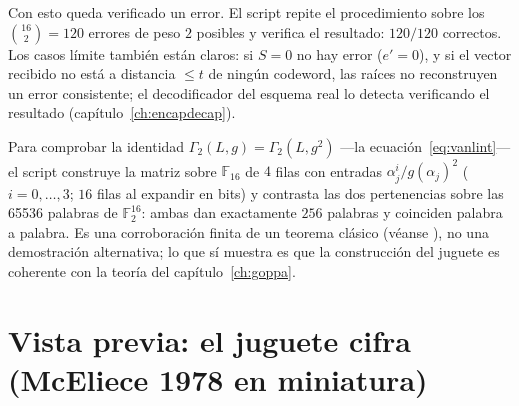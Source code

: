 \documentclass[11pt,a4paper,oneside]{report}
\newcommand{\F}{\mathbb{F}}
\newcommand{\GF}[1]{\mathbb{F}_{#1}}
\newcommand{\Ftwo}{\F_2}
\begin{document}
Con esto queda verificado un error. El script repite el procedimiento
sobre los $\binom{16}{2}=120$ errores de peso $2$ posibles y verifica el
resultado: $\num{120}/\num{120}$ correctos. Los casos límite también
están claros: si $S=0$ no hay error ($e'=0$), y si el vector recibido no
está a distancia $\le t$ de ningún codeword, las raíces no reconstruyen
un error consistente; el decodificador del esquema real lo detecta
verificando el resultado (capítulo~\ref{ch:encapdecap}).

\begin{lab}
Para comprobar la identidad $\Gamma_2(L,g)=\Gamma_2(L,g^2)$ —la
ecuación~\eqref{eq:vanlint}— el script construye la matriz sobre
$\GF{16}$ de $4$ filas con entradas $\alpha_j^i/g(\alpha_j)^2$
($i=0,\dots,3$; $16$ filas al expandir en bits) y contrasta las dos
pertenencias sobre las \num{65536} palabras de $\Ftwo^{16}$: ambas dan
exactamente $\num{256}$ palabras y coinciden palabra a palabra. Es una
corroboración finita de un teorema clásico (véanse
\cite{msbook,vlint}), no una demostración alternativa; lo que sí
muestra es que la construcción del juguete es coherente con la teoría
del capítulo~\ref{ch:goppa}.
\end{lab}

\section{Vista previa: el juguete cifra (McEliece 1978 en miniatura)}
\end{document}
